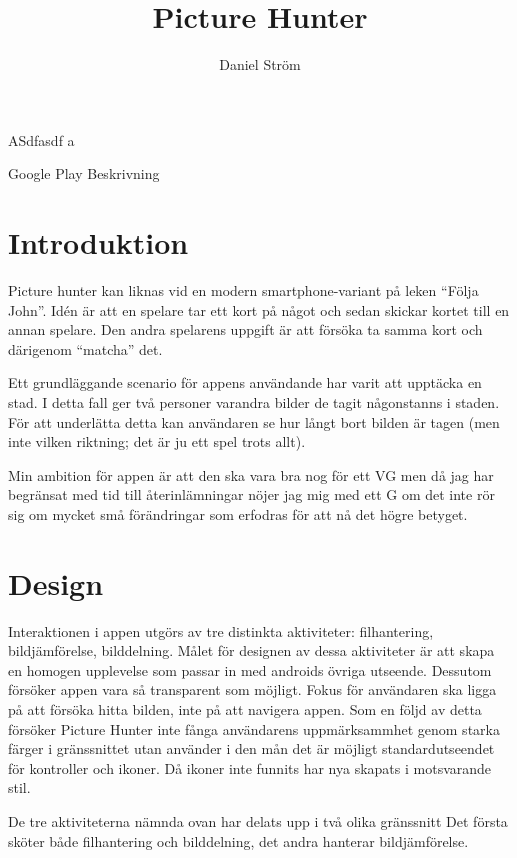 \documentclass[11px, a4paper]{article}
\title{Picture Hunter}
\author{Daniel Ström \\ \mail{D@nielstrom.se}}
\begin{document}
\maketitle
	
\epigraph{ ASdfasdf a}{Google Play Beskrivning}

\tableofcontents

\listoffigures


\section{Introduktion}
	Picture hunter kan liknas vid en modern smartphone-variant på leken ``Följa John''. Idén är att en spelare tar ett kort på något och sedan skickar kortet till en annan spelare. Den andra spelarens uppgift är att försöka ta samma kort och därigenom ``matcha'' det.

	Ett grundläggande scenario för appens användande har varit att upptäcka en stad. I detta fall ger två personer varandra bilder de tagit någonstanns i staden. För att underlätta detta kan användaren se hur långt bort bilden är tagen (men inte vilken riktning; det är ju ett spel trots allt).

	Min ambition för appen är att den ska vara bra nog för ett VG men då jag har begränsat med tid till återinlämningar nöjer jag mig med ett G om det inte rör sig om mycket små förändringar som erfodras för att nå det högre betyget.


\section{Design}

	Interaktionen i appen utgörs av tre distinkta aktiviteter: filhantering, bildjämförelse,	bilddelning. Målet för designen av dessa aktiviteter är att skapa en homogen upplevelse som passar in med androids övriga utseende. Dessutom försöker appen vara så transparent som möjligt. Fokus för användaren ska ligga på att försöka hitta bilden, inte på att navigera appen. Som en följd av detta försöker Picture Hunter inte fånga användarens uppmärksammhet genom starka färger i gränssnittet utan använder i den mån det är möjligt standardutseendet för kontroller och ikoner. Då ikoner inte funnits har nya skapats i motsvarande stil.

	De tre aktiviteterna nämnda ovan har delats upp i två olika gränssnitt Det första sköter både filhantering och bilddelning, det andra hanterar bildjämförelse.
\end{document}
